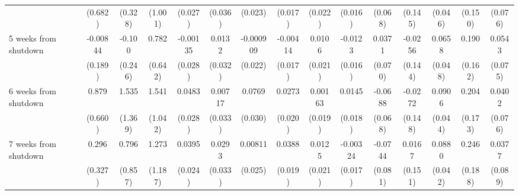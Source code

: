 \begin{table}[htbp]
\begin{tabular}{l*{14}{c}}
                    &     (0.682)         &     (0.328)         &     (1.001)         &     (0.027)         &     (0.036)         &     (0.023)         &     (0.017)         &     (0.022)         &     (0.016)         &     (0.068)         &     (0.145)         &     (0.046)         &     (0.150)         &     (0.076)         \\
[1em]
5 weeks from shutdown&    -0.00844         &      -0.100         &       0.782         &    -0.00135         &      0.0132         &   -0.000909         &    -0.00414         &      0.0106         &     -0.0123         &      0.0371         &     -0.0256         &      0.0658         &       0.190         &      0.0543         \\
                    &     (0.189)         &     (0.246)         &     (0.642)         &     (0.028)         &     (0.032)         &     (0.022)         &     (0.017)         &     (0.021)         &     (0.016)         &     (0.070)         &     (0.144)         &     (0.048)         &     (0.162)         &     (0.075)         \\
[1em]
6 weeks from shutdown&       0.879         &       1.535         &       1.541         &      0.0483\sym{*}  &     0.00717         &      0.0769\sym{**} &      0.0273         &     0.00163         &      0.0145         &     -0.0688         &     -0.0272         &      0.0906\sym{**} &       0.204         &      0.0402         \\
                    &     (0.660)         &     (1.369)         &     (1.042)         &     (0.028)         &     (0.033)         &     (0.030)         &     (0.020)         &     (0.019)         &     (0.018)         &     (0.068)         &     (0.148)         &     (0.044)         &     (0.173)         &     (0.076)         \\
[1em]
7 weeks from shutdown&       0.296         &       0.796         &       1.273         &      0.0395\sym{*}  &      0.0293         &     0.00811         &      0.0388\sym{**} &      0.0125         &    -0.00324         &     -0.0744         &      0.0167         &      0.0880\sym{**} &       0.246         &      0.0377         \\
                    &     (0.327)         &     (0.857)         &     (1.187)         &     (0.024)         &     (0.033)         &     (0.025)         &     (0.019)         &     (0.021)         &     (0.017)         &     (0.081)         &     (0.151)         &     (0.042)         &     (0.188)         &     (0.089)         \\

\end{tabular}
\end{table}
